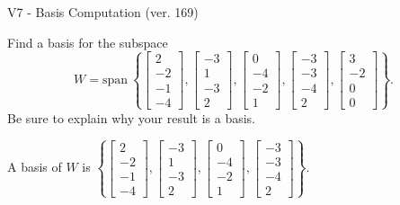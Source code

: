 \begin{exercise}
  \begin{exerciseTitle}V7 - Basis Computation (ver. 169)\end{exerciseTitle}
  \begin{exerciseStatement}
    Find a basis for the subspace 
\[W=\mathrm{span}\ \left\{\left[\begin{array}{r}
2 \\
-2 \\
-1 \\
-4
\end{array}\right] , \left[\begin{array}{r}
-3 \\
1 \\
-3 \\
2
\end{array}\right] , \left[\begin{array}{r}
0 \\
-4 \\
-2 \\
1
\end{array}\right] , \left[\begin{array}{r}
-3 \\
-3 \\
-4 \\
2
\end{array}\right] , \left[\begin{array}{r}
3 \\
-2 \\
0 \\
0
\end{array}\right]\right\}.\]
 Be sure to explain why your result is a basis.


  \end{exerciseStatement}
  \begin{exerciseAnswer}
   A basis of \(W\) is  \(\left\{\left[\begin{array}{r}
2 \\
-2 \\
-1 \\
-4
\end{array}\right] , \left[\begin{array}{r}
-3 \\
1 \\
-3 \\
2
\end{array}\right] , \left[\begin{array}{r}
0 \\
-4 \\
-2 \\
1
\end{array}\right] , \left[\begin{array}{r}
-3 \\
-3 \\
-4 \\
2
\end{array}\right]\right\}\).
  


  \end{exerciseAnswer}
\end{exercise}